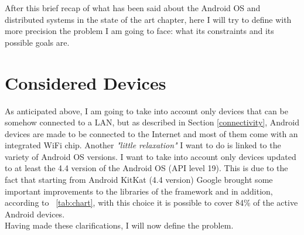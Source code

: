 After this brief recap of what has been said about the Android OS and distributed systems in the state of the art chapter, here I will try to define with more precision the problem I am going to face: what its constraints and its possible goals are.

\section{Considered Devices}
As anticipated above, I am going to take into account only devices that can be somehow connected to a LAN, but as described in Section \ref{connectivity}, Android devices are made to be connected to the Internet and most of them come with an integrated WiFi chip. Another \textit{"little relaxation"} I want to do is linked to the variety of Android OS versions. I want to take into account only devices updated to at least the 4.4 version of the Android OS (API level 19). This is due to the fact that starting from Android KitKat (4.4 version) Google brought some important improvements  to the libraries of the framework and in addition, according to \tablename~\ref{tab:chart}, with this choice it is possible to cover 84\% of the active Android devices.\\
Having made these clarifications, I will now define the problem.

